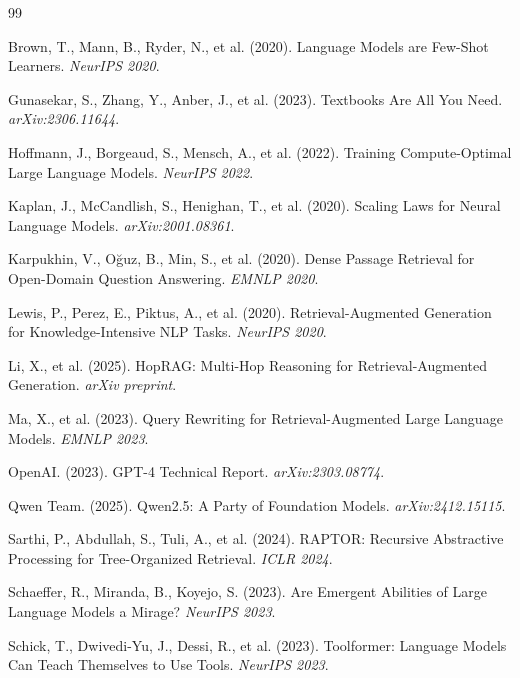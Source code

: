 \documentclass[11pt]{article}
\begin{document}
\begin{thebibliography}{99}

Brown, T., Mann, B., Ryder, N., et al. (2020).
Language Models are Few-Shot Learners.
\emph{NeurIPS 2020}.

Gunasekar, S., Zhang, Y., Anber, J., et al. (2023).
Textbooks Are All You Need.
\emph{arXiv:2306.11644}.

Hoffmann, J., Borgeaud, S., Mensch, A., et al. (2022).
Training Compute-Optimal Large Language Models.
\emph{NeurIPS 2022}.

Kaplan, J., McCandlish, S., Henighan, T., et al. (2020).
Scaling Laws for Neural Language Models.
\emph{arXiv:2001.08361}.

Karpukhin, V., O\u{g}uz, B., Min, S., et al. (2020).
Dense Passage Retrieval for Open-Domain Question Answering.
\emph{EMNLP 2020}.

Lewis, P., Perez, E., Piktus, A., et al. (2020).
Retrieval-Augmented Generation for Knowledge-Intensive NLP Tasks.
\emph{NeurIPS 2020}.

Li, X., et al. (2025).
HopRAG: Multi-Hop Reasoning for Retrieval-Augmented Generation.
\emph{arXiv preprint}.

Ma, X., et al. (2023).
Query Rewriting for Retrieval-Augmented Large Language Models.
\emph{EMNLP 2023}.

OpenAI. (2023).
GPT-4 Technical Report.
\emph{arXiv:2303.08774}.

Qwen Team. (2025).
Qwen2.5: A Party of Foundation Models.
\emph{arXiv:2412.15115}.

Sarthi, P., Abdullah, S., Tuli, A., et al. (2024).
RAPTOR: Recursive Abstractive Processing for Tree-Organized Retrieval.
\emph{ICLR 2024}.

Schaeffer, R., Miranda, B., Koyejo, S. (2023).
Are Emergent Abilities of Large Language Models a Mirage?
\emph{NeurIPS 2023}.

Schick, T., Dwivedi-Yu, J., Dessi, R., et al. (2023).
Toolformer: Language Models Can Teach Themselves to Use Tools.
\emph{NeurIPS 2023}.


\end{thebibliography}
\end{document}

